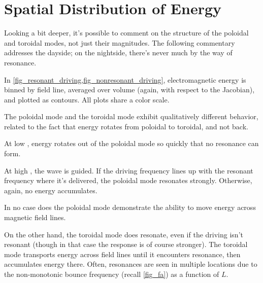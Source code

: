 

\section{Spatial Distribution of Energy}
  \label{sec_shells}

Looking a bit deeper, it's possible to comment on the structure of the poloidal and toroidal modes, not just their magnitudes. The following commentary addresses the dayside; on the nightside, there's never much by the way of resonance. 

In \cref{fig_resonant_driving,fig_nonresonant_driving}, electromagnetic energy is binned by field line, averaged over volume (again, with respect to the Jacobian), and plotted as contours. All plots share a color scale. 

The poloidal mode and the toroidal mode exhibit qualitatively different behavior, related to the fact that energy rotates from poloidal to toroidal, and not back. 

At low \azm, energy rotates out of the poloidal mode so quickly that no resonance can form. 

At high \azm, the \Alfven wave is guided. If the driving frequency lines up with the resonant frequency where it's delivered, the poloidal mode resonates strongly. Otherwise, again, no energy accumulates. 

In no case does the poloidal mode demonstrate the ability to move energy across magnetic field lines. 

On the other hand, the toroidal mode does resonate, even if the driving isn't resonant (though in that case the response is of course stronger). The toroidal mode transports energy across field lines until it encounters resonance, then accumulates energy there. Often, resonances are seen in multiple locations due to the non-monotonic \Alfven bounce frequency (recall \cref{fig_fa}) as a function of $L$. 

